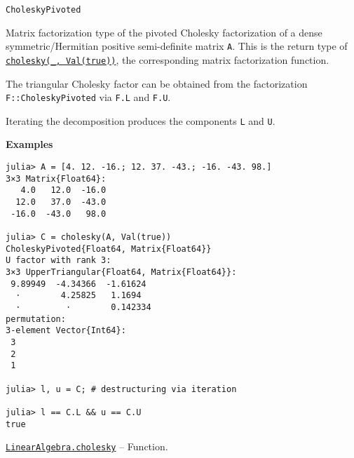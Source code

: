 \begin{adjustwidth}{2em}{0pt}


\begin{verbatim}
CholeskyPivoted
\end{verbatim}

Matrix factorization type of the pivoted Cholesky factorization of a dense symmetric/Hermitian positive semi-definite matrix \texttt{A}. This is the return type of \hyperlink{7653413936706994771}{\texttt{cholesky(\_, Val(true))}}, the corresponding matrix factorization function.

The triangular Cholesky factor can be obtained from the factorization \texttt{F::CholeskyPivoted} via \texttt{F.L} and \texttt{F.U}.

Iterating the decomposition produces the components \texttt{L} and \texttt{U}.

\textbf{Examples}


\begin{verbatim}
julia> A = [4. 12. -16.; 12. 37. -43.; -16. -43. 98.]
3×3 Matrix{Float64}:
   4.0   12.0  -16.0
  12.0   37.0  -43.0
 -16.0  -43.0   98.0

julia> C = cholesky(A, Val(true))
CholeskyPivoted{Float64, Matrix{Float64}}
U factor with rank 3:
3×3 UpperTriangular{Float64, Matrix{Float64}}:
 9.89949  -4.34366  -1.61624
  ⋅        4.25825   1.1694
  ⋅         ⋅        0.142334
permutation:
3-element Vector{Int64}:
 3
 2
 1

julia> l, u = C; # destructuring via iteration

julia> l == C.L && u == C.U
true
\end{verbatim}



\end{adjustwidth}
\hypertarget{7653413936706994771}{}
\hyperlink{7653413936706994771}{\texttt{LinearAlgebra.cholesky}}  -- {Function.}

